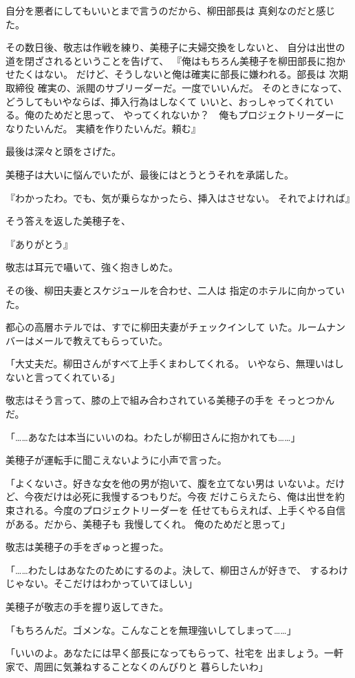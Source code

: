 ﻿\documentclass[
    book,tate,
    line_length=30zw,
    jafontsize=12pt,
    paper=b5j,
    landscape,
    ]{jlreq}
\begin{document}
自分を悪者にしてもいいとまで言うのだから、柳田部長は
真剣なのだと感じた。

その数日後、敬志は作戦を練り、美穂子に夫婦交換をしないと、
自分は出世の道を閉ざされるということを告げて、
『俺はもちろん美穂子を柳田部長に抱かせたくはない。
だけど、そうしないと俺は確実に部長に嫌われる。部長は
次期取締役 確実の、派閥のサブリーダーだ。一度でいいんだ。
そのときになって、どうしてもいやならば、挿入行為はしなくて
いいと、おっしゃってくれている。俺のためだと思って、
やってくれないか？　俺もプロジェクトリーダーになりたいんだ。
実績を作りたいんだ。頼む』

最後は深々と頭をさげた。

美穂子は大いに悩んでいたが、最後にはとうとうそれを承諾した。

『わかったわ。でも、気が乗らなかったら、挿入はさせない。
それでよければ』

そう答えを返した美穂子を、

『ありがとう』

敬志は耳元で囁いて、強く抱きしめた。

その後、柳田夫妻とスケジュールを合わせ、二人は
指定のホテルに向かっていた。

都心の高層ホテルでは、すでに柳田夫妻がチェックインして
いた。ルームナンバーはメールで教えてもらっていた。

「大丈夫だ。柳田さんがすべて上手くまわしてくれる。
いやなら、無理いはしないと言ってくれている」

敬志はそう言って、膝の上で組み合わされている美穂子の手を
そっとつかんだ。

「……あなたは本当にいいのね。わたしが柳田さんに抱かれても……」

美穂子が運転手に聞こえないように小声で言った。

「よくないさ。好きな女を他の男が抱いて、腹を立てない男は
いないよ。だけど、今夜だけは必死に我慢するつもりだ。今夜
だけこらえたら、俺は出世を約束される。今度のプロジェクトリーダーを
任せてもらえれば、上手くやる自信がある。だから、美穂子も
我慢してくれ。 俺のためだと思って」

敬志は美穂子の手をぎゅっと握った。

「……わたしはあなたのためにするのよ。決して、柳田さんが好きで、
するわけじゃない。そこだけはわかっていてほしい」

美穂子が敬志の手を握り返してきた。

「もちろんだ。ゴメンな。こんなことを無理強いしてしまって……」

「いいのよ。あなたには早く部長になってもらって、社宅を
出ましょう。一軒家で、周囲に気兼ねすることなくのんびりと
暮らしたいわ」
\end{document}
